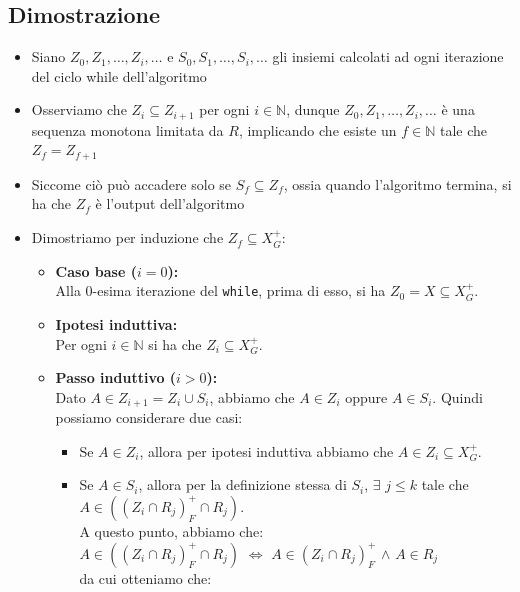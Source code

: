 \documentclass{article}
\begin{document}
\subsection{Dimostrazione}
\begin{itemize}
  \item Siano $Z_0,Z_1, \dots,Z_i, \dots$ e $S_0,S_1,\dots ,S_i,\dots$ gli insiemi calcolati ad ogni iterazione del ciclo while dell'algoritmo
  \item Osserviamo che $Z_i \subseteq Z_{i+1}$ per ogni $i \in \mathbb{N}$, dunque $Z_0, Z_1, \ldots, Z_i, \ldots$ è una sequenza monotona limitata da $R$, implicando che esiste un $f \in \mathbb{N}$ tale che $Z_f = Z_{f+1}$
  \item Siccome ciò può accadere solo se $S_f \subseteq Z_f$, ossia quando l'algoritmo termina, si ha che $Z_f$ è l'output dell'algoritmo
  \item Dimostriamo per induzione che $Z_f \subseteq X_G^+$:
  \begin{itemize}
    \item \textbf{Caso base ($i = 0$):} \\
    Alla 0-esima iterazione del \texttt{while}, prima di esso, si ha $Z_0 = X \subseteq X_G^+$.
    
    \item \textbf{Ipotesi induttiva:} \\
    Per ogni $i \in \mathbb{N}$ si ha che $Z_i \subseteq X_G^+$.
    
    \item \textbf{Passo induttivo ($i > 0$):} \\
    Dato $A \in Z_{i+1} = Z_i \cup S_i$, abbiamo che $A \in Z_i$ oppure $A \in S_i$. Quindi possiamo considerare due casi:
    
    \begin{itemize}
      \item Se $A \in Z_i$, allora per ipotesi induttiva abbiamo che $A \in Z_i \subseteq X_G^+$.
      \item Se $A \in S_i$, allora per la definizione stessa di $S_i$, $\exists$ $j \leq k$ tale che $A \in ((Z_i \cap R_j)^+_F \cap R_j)$.\\
      
      A questo punto, abbiamo che:\\

      $A \in ((Z_i \cap R_j)^+_F \cap R_j)$ $\Leftrightarrow$ $A \in (Z_i \cap R_j)^+_F$ $\land$ $A \in R_j$ \\ 

      da cui otteniamo che:\\ 
      

\end{itemize}
\end{itemize}
\end{itemize}
\end{document}

